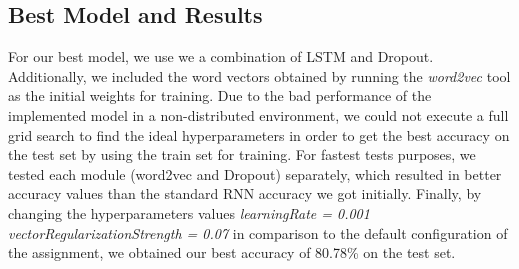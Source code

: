 \documentclass{article} %
\begin{document}
\subsection*{Best Model and Results}

For our best model, we use we a combination of LSTM and Dropout. Additionally, we included the word vectors obtained by running the \textit{word2vec} tool as the initial weights for training. Due to the bad performance of the implemented model in a non-distributed environment, we could not execute a full grid search to find the ideal hyperparameters in order to get the best accuracy on the test set by using the train set for training. For fastest tests purposes, we tested each module (word2vec and Dropout) separately, which resulted in better accuracy values than the standard RNN accuracy we got initially. Finally, by changing the hyperparameters values \textit{learningRate = 0.001 vectorRegularizationStrength = 0.07} in comparison to the default configuration of the assignment, we obtained our best accuracy of 80.78\% on the test set.

\printbibliography
\end{document}
